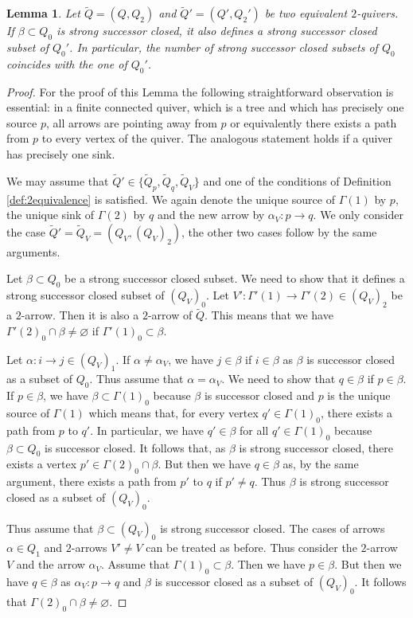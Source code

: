 \documentclass{amsart}
\newtheorem{lemma}[theorem]{Lemma}
\numberwithin{equation}{section}
\begin{document}
\begin{lemma}\label{lem:2equivalence}
Let $\tilde Q=(Q,Q_2)$ and $\tilde Q'=(Q',Q_2')$ be two equivalent $2$-quivers. If $\beta\subset Q_0$ is strong successor closed, it also defines a strong successor closed subset of $Q_0'$. In particular, the number of strong successor closed subsets of $Q_0$ coincides with the one of $ Q_0'$.
\end{lemma}
\begin{proof}
For the proof of this Lemma the following straightforward observation is essential: in a finite connected quiver, which is a tree and which has precisely one source $p$, all arrows are pointing away from $p$ or equivalently there exists a path from $p$ to every vertex of the quiver. The analogous statement holds if a quiver has precisely one sink. 

We may assume that $\tilde Q'\in\{\tilde Q_p,\tilde Q_q,\tilde Q_V\}$ and one of the conditions of Definition \ref{def:2equivalence} is satisfied. We again denote the unique source of $\Gamma(1)$ by $p$, the unique sink of $\Gamma(2)$ by $q$ and the new arrow by $\alpha_V:p\to q$. We only consider the case $\tilde Q'=\tilde Q_V=(Q_V,(Q_V)_2)$, the other two cases follow by the same arguments. 

Let $\beta\subset Q_0$ be a strong successor closed subset. We need to show that it defines a strong successor closed subset of $(Q_V)_0$.
Let $V':\Gamma'(1)\to\Gamma'(2)\in (Q_V)_2$ be a  $2$-arrow. Then it is also a $2$-arrow of $\tilde Q$. This means that  we have $\Gamma'(2)_0\cap \beta\neq\varnothing$ if $\Gamma'(1)_0\subset \beta$. 
 
Let $\alpha:i\to j\in (Q_V)_1$. If $\alpha\neq\alpha_V$, we have $j\in \beta$ if $i\in\beta$ as $\beta$ is successor closed as a subset of $ Q_0$. Thus assume that $\alpha=\alpha_V$. We need to show that $q\in\beta$ if $p\in\beta$. If $p\in\beta$, we have $\beta\subset\Gamma(1)_0$ because $\beta$ is successor closed and $p$ is the unique source of $\Gamma(1)$ which means that, for every vertex $q'\in\Gamma(1)_0$, there exists a path from $p$ to $q'$. In particular, we have $q'\in\beta$ for all $q'\in\Gamma(1)_0$ because $\beta\subset Q_0$ is successor closed. It follows that, as $\beta$ is strong successor closed, there exists a vertex $p'\in\Gamma(2)_0\cap\beta$. But then we have $q\in\beta$ as, by the same argument, there exists a path from $p'$ to $q$ if $p'\neq q$. Thus $\beta$ is strong successor closed as a subset of $(Q_V)_0$.


Thus assume that $\beta\subset (Q_V)_0$ is strong successor closed. The cases of arrows $\alpha\in Q_1$ and $2$-arrows $V'\neq V$ can be treated as before. Thus consider the $2$-arrow $V$ and the arrow $\alpha_V$. Assume that $\Gamma(1)_0\subset\beta$. Then we have $p\in\beta$. But then we have $q\in\beta$ as $\alpha_V:p\to q$ and $\beta$ is successor closed as a subset of $(Q_V)_0$. It follows that $\Gamma(2)_0\cap\beta\neq\varnothing$.
\end{proof}
\end{document}
